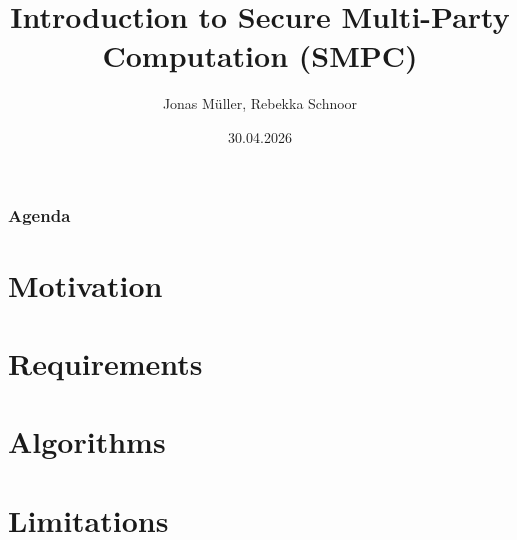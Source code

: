 \documentclass[t,aspectratio=169]{beamer}
\title{Introduction to Secure Multi-Party Computation (SMPC)}
\author[]{Jonas Müller, Rebekka Schnoor}
\date{30.04.2026} %
\begin{document}
\begin{frame}
	\maketitle
\end{frame}

\begin{frame}
	\frametitle{Agenda}
	\tableofcontents
\end{frame}
\section{Motivation}
\section{Requirements}
\section{Algorithms}
\section{Limitations}
\end{document}
